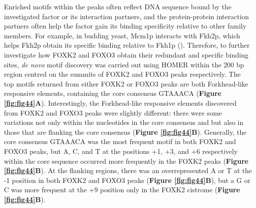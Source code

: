 Enriched motifs within the peaks often reflect DNA sequence bound by the investigated factor or its interaction partners, and the protein-protein interaction partners often help the factor gain its binding specificity relative to other family members. For example, in budding yeast, Mcm1p interacts with Fkh2p, which helps Fkh2p obtain its specific binding relative to Fkh1p (\cite{hollenhorst2001mechanisms}). Therefore, to further investigate how FOXK2 and FOXO3 obtain their redundant and specific binding sites, \textit{de novo} motif discovery was carried out using HOMER within the 200 bp region centred on the summits of FOXK2 and FOXO3 peaks respectively. The top motifs returned from either FOXK2 or FOXO3 peaks are both Forkhead-like responsive elements, containing the core consensus GTAAACA (\textbf{Figure \ref{fig:fig44}A}). Interestingly, the Forkhead-like responsive elements discovered from FOXK2 and FOXO3 peaks were slightly different: there were some variations not only within the nucleotides in the core consensus and but also in those that are flanking the core consensus (\textbf{Figure \ref{fig:fig44}B}). Generally, the core consensus GTAAACA was the most frequent motif in both FOXK2 and FOXO3 peaks, but A, C, and T at the positions +1, +3, and +6 respectively within the core sequence occurred more frequently in the FOXK2 peaks (\textbf{Figure \ref{fig:fig44}B}). At the flanking regions, there was an overrepresented A or T at the -1 position in both FOXK2 and FOXO3 peaks (\textbf{Figure \ref{fig:fig44}B}), but a G or C was more frequent at the +9 position only in the FOXK2 cistrome (\textbf{Figure \ref{fig:fig44}B}).

